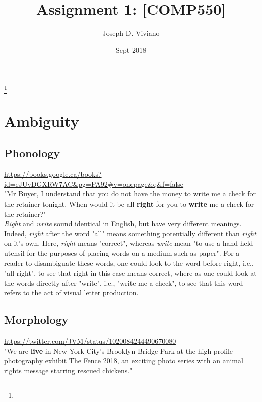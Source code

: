\documentclass{amsart}
\theoremstyle{definition}
\theoremstyle{remark}
\numberwithin{equation}{section}
\begin{document}
\title{Assignment 1: [COMP550]}

\author{Joseph D. Viviano}
\address{McGill University}
\curraddr{}
\thanks{}
\date{Sept 2018}

\maketitle

\section{Ambiguity}

\subsection{Phonology}

\url{https://books.google.ca/books?id=eJUvDGXRW7AC&pg=PA92#v=onepage&q&f=false} \\

"Mr Buyer, I understand that you do not have the money to write me a check for the retainer tonight. When would it be all \textbf{right} for you to \textbf{write} me a check for the retainer?" \\

\textit{Right} and \textit{write} sound identical in English, but have very different meanings. Indeed, \textit{right} after the word "all" means something potentially different than \textit{right} on it's own. Here, \textit{right} means "correct", whereas \textit{write} mean "to use a hand-held utensil for the purposes of placing words on a medium such as paper". For a reader to disambiguate these words, one could look to the word before right, i.e., "all right", to see that right in this case means correct, where as one could look at the words directly after "write", i.e., "write me a check", to see that this word refers to the act of visual letter production. \\

\subsection{Morphology}

\url{https://twitter.com/JVM/status/1020084244490670080} \\

"We are \textbf{live} in New York City’s Brooklyn Bridge Park at the high-profile photography exhibit The Fence 2018, an exciting photo series with an animal rights message starring rescued chickens." \\
\end{document}
